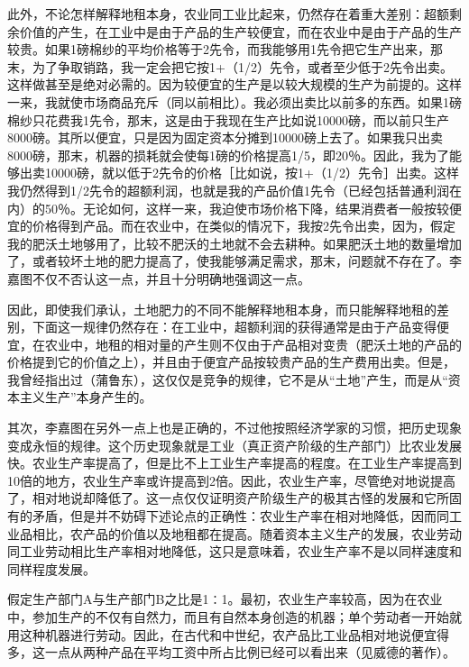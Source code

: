 此外，不论怎样解释地租本身，农业同工业比起来，仍然存在着重大差别：超额剩余价值的产生，在工业中是由于产品的生产较便宜，而在农业中是由于产品的生产较贵。如果1磅棉纱的平均价格等于2先令，而我能够用1先令把它生产出来，那末，为了争取销路，我一定会把它按1+（1/2）先令，或者至少低于2先令出卖。这样做甚至是绝对必需的。因为较便宜的生产是以较大规模的生产为前提的。这样一来，我就使市场商品充斥（同以前相比）。我必须出卖比以前多的东西。如果1磅棉纱只花费我1先令，那末，这是由于我现在生产比如说10000磅，而以前只生产8000磅。其所以便宜，只是因为固定资本分摊到10000磅上去了。如果我只出卖8000磅，那末，机器的损耗就会使每1磅的价格提高1/5，即20％。因此，我为了能够出卖10000磅，就以低于2先令的价格［比如说，按1+（1/2）先令］出卖。这样我仍然得到1/2先令的超额利润，也就是我的产品价值1先令（已经包括普通利润在内）的50％。无论如何，这样一来，我迫使市场价格下降，结果消费者一般按较便宜的价格得到产品。而在农业中，在类似的情况下，我按2先令出卖，因为，假定我的肥沃土地够用了，比较不肥沃的土地就不会去耕种。如果肥沃土地的数量增加了，或者较坏土地的肥力提高了，使我能够满足需求，那末，问题就不存在了。李嘉图不仅不否认这一点，并且十分明确地强调这一点。

因此，即使我们承认，土地肥力的不同不能解释地租本身，而只能解释地租的差别，下面这一规律仍然存在：在工业中，超额利润的获得通常是由于产品变得便宜，在农业中，地租的相对量的产生则不仅由于产品相对变贵（肥沃土地的产品的价格提到它的价值之上），并且由于便宜产品按较贵产品的生产费用出卖。但是，我曾经指出过（蒲鲁东），这仅仅是竞争的规律，它不是从“土地”产生，而是从“资本主义生产”本身产生的。

其次，李嘉图在另外一点上也是正确的，不过他按照经济学家的习惯，把历史现象变成永恒的规律。这个历史现象就是工业（真正资产阶级的生产部门）比农业发展快。农业生产率提高了，但是比不上工业生产率提高的程度。在工业生产率提高到10倍的地方，农业生产率或许提高到2倍。因此，农业生产率，尽管绝对地说提高了，相对地说却降低了。这一点仅仅证明资产阶级生产的极其古怪的发展和它所固有的矛盾，但是并不妨碍下述论点的正确性：农业生产率在相对地降低，因而同工业品相比，农产品的价值以及地租都在提高。随着资本主义生产的发展，农业劳动同工业劳动相比生产率相对地降低，这只是意味着，农业生产率不是以同样速度和同样程度发展。

假定生产部门A与生产部门B之比是1∶1。最初，农业生产率较高，因为在农业中，参加生产的不仅有自然力，而且有自然本身创造的机器；单个劳动者一开始就用这种机器进行劳动。因此，在古代和中世纪，农产品比工业品相对地说便宜得多，这一点从两种产品在平均工资中所占比例已经可以看出来（见威德的著作）。

